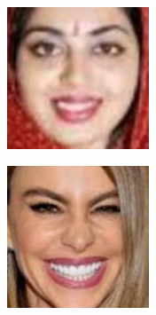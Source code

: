 \documentclass{cubeamer}
\begin{document}
\begin{frame}
\begin{minipage}{.49\textwidth}
\begin{figure}
	\begin{subfigure}{.45\textwidth}
		\centering
		\includegraphics[width=.8\linewidth]{img/pm1.jpg}  
	\end{subfigure}
	\begin{subfigure}{.45\textwidth}
		\centering
		\includegraphics[width=.8\linewidth]{img/pm2.jpg}  
	\end{subfigure}


\end{figure}
\end{minipage}
\end{frame}
\end{document}
